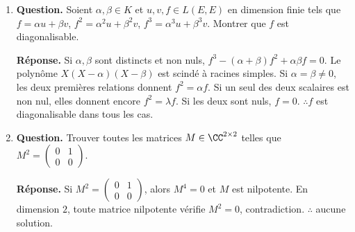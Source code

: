 \documentclass[12pt, a4paper]{article}
\begin{document}
\begin{enumerate}[label=9.\arabic*., start=94]
\begin{minipage}[t]{\linewidth}
\begin{enumerate}[\arabic*.]
  \item \textbf{Question.} Supposons désormais $\operatorname{tr}A=\det A=0$.
\begin{enumerate}[a.]
            \item \textbf{Question.} Si $A$ possède une valeur propre non nulle, montrer qu’elle est diagonalisable puis semblable à $-A$.
\par\smallskip
\textbf{Réponse.} Les valeurs propres sont $0,\lambda,-\lambda$ avec $\lambda\neq0$ : elles sont distinctes.
            Donc $A$ et $-A$ sont diagonalisables avec les mêmes valeurs propres, et sont semblables.

  \item \textbf{Question.} Si toutes ses valeurs propres sont nulles, montrer qu’elle est nilpotente puis semblable à $-A$.
\par\smallskip
\textbf{Réponse.} Sinon $\chi_A=X^3$, donc $A^3=0$.
            Chaque bloc nilpotent de Jordan est semblable à son opposé, en changeant alternativement les signes des vecteurs de sa chaîne.
            $\therefore A$ est semblable à $-A$.

\end{enumerate}

\end{enumerate}
\end{minipage}

  \item \begin{minipage}[t]{\linewidth}\raggedright
\textbf{Question.} Soient $\alpha,\beta\in K$ et $u,v,f\in L(E,E)$ en dimension finie tels que $f=\alpha u+\beta v$, $f^2=\alpha^2u+\beta^2v$, $f^3=\alpha^3u+\beta^3v$. Montrer que $f$ est diagonalisable.
\par\smallskip
\textbf{Réponse.} Si $\alpha,\beta$ sont distincts et non nuls,
    $f^3-(\alpha+\beta)f^2+\alpha\beta f=0$.
    Le polynôme $X(X-\alpha)(X-\beta)$ est scindé à racines simples.
    Si $\alpha=\beta\neq0$, les deux premières relations donnent $f^2=\alpha f$.
    Si un seul des deux scalaires est non nul, elles donnent encore $f^2=\lambda f$.
    Si les deux sont nuls, $f=0$.
    $\therefore f$ est diagonalisable dans tous les cas.
\end{minipage}

  \item \begin{minipage}[t]{\linewidth}\raggedright
\textbf{Question.} Trouver toutes les matrices $M\in\CC^{2\times2}$ telles que $M^2=\begin{pmatrix}0&1\\0&0\end{pmatrix}$.
\par\smallskip
\textbf{Réponse.} Si $M^2=\begin{pmatrix}0&1\\0&0\end{pmatrix}$, alors $M^4=0$ et $M$ est nilpotente.
    En dimension $2$, toute matrice nilpotente vérifie $M^2=0$, contradiction.
    $\therefore$ aucune solution.
\end{minipage}


\end{enumerate}
\end{document}
